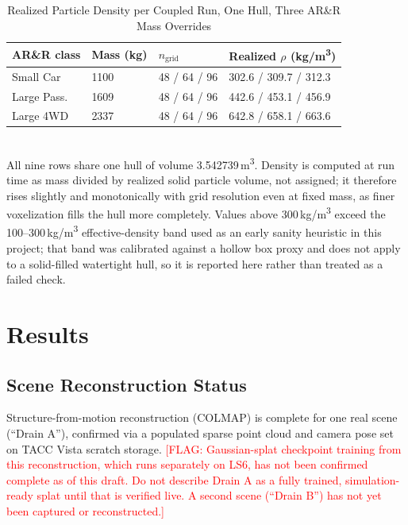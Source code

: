 \documentclass[conference]{IEEEtran}
\newcommand{\FLAG}[1]{\textcolor{red}{[FLAG: #1]}}
\begin{document}
\begin{table}[t]
\caption{Realized Particle Density per Coupled Run, One Hull, Three AR\&R Mass Overrides}
\label{tab:vehicle}
\centering
\begin{tabular}{@{}p{0.62in}p{0.42in}p{0.62in}p{0.72in}@{}}
\toprule
\textbf{AR\&R class} & \textbf{Mass (kg)} & \textbf{$n_{\text{grid}}$} & \textbf{Realized $\rho$ (kg/m\textsuperscript{3})} \\
\midrule
Small Car      & 1100 & 48 / 64 / 96 & 302.6 / 309.7 / 312.3 \\
Large Pass.\   & 1609 & 48 / 64 / 96 & 442.6 / 453.1 / 456.9 \\
Large 4WD      & 2337 & 48 / 64 / 96 & 642.8 / 658.1 / 663.6 \\
\bottomrule
\end{tabular}
\\[2pt]
{\footnotesize All nine rows share one hull of volume 3.542739\,m\textsuperscript{3}. Density is computed at run time as mass divided by realized solid particle volume, not assigned; it therefore rises slightly and monotonically with grid resolution even at fixed mass, as finer voxelization fills the hull more completely. Values above 300\,kg/m\textsuperscript{3} exceed the 100--300\,kg/m\textsuperscript{3} effective-density band used as an early sanity heuristic in this project; that band was calibrated against a hollow box proxy and does not apply to a solid-filled watertight hull, so it is reported here rather than treated as a failed check.}
\end{table}

\section{Results}
\label{sec:results}

\subsection{Scene Reconstruction Status}
Structure-from-motion reconstruction (COLMAP) is complete for one real scene (``Drain A''), confirmed via a populated sparse point cloud and camera pose set on TACC Vista scratch storage. \FLAG{Gaussian-splat checkpoint training from this reconstruction, which runs separately on LS6, has not been confirmed complete as of this draft. Do not describe Drain A as a fully trained, simulation-ready splat until that is verified live. A second scene (``Drain B'') has not yet been captured or reconstructed.}
\end{document}
